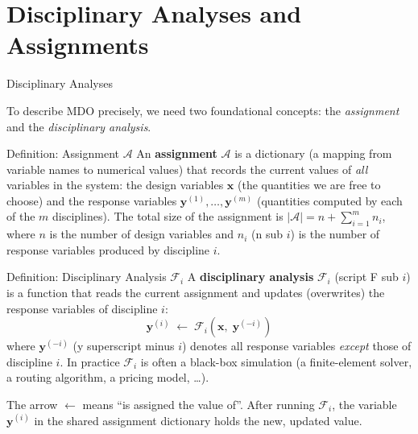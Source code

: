 \documentclass[aspectratio=169,10pt]{beamer}
\begin{document}
\section{Disciplinary Analyses and Assignments}

\begin{frame}[allowframebreaks]{Disciplinary Analyses}

  To describe MDO precisely, we need two foundational concepts: the
  \emph{assignment} and the \emph{disciplinary analysis}.

  \begin{block}{Definition: Assignment $\mathcal{A}$}
    An \textbf{assignment} $\mathcal{A}$ is a dictionary (a mapping from
    variable names to numerical values) that records the current values of
    \emph{all} variables in the system: the design variables $\mathbf{x}$
    (the quantities we are free to choose) and the response variables
    $\mathbf{y}^{(1)}, \ldots, \mathbf{y}^{(m)}$ (quantities computed by
    each of the $m$ disciplines).  The total size of the assignment is
    $|\mathcal{A}| = n + \sum_{i=1}^{m} n_i$, where $n$ is the number of
    design variables and $n_i$ (n sub $i$) is the number of response
    variables produced by discipline $i$.
  \end{block}

  \begin{block}{Definition: Disciplinary Analysis $\mathcal{F}_i$}
    A \textbf{disciplinary analysis} $\mathcal{F}_i$ (script F sub $i$) is
    a function that reads the current assignment and updates (overwrites)
    the response variables of discipline $i$:
    \[
      \mathbf{y}^{(i)} \;\leftarrow\; \mathcal{F}_i\!\left(\mathbf{x},\;
      \mathbf{y}^{(-i)}\right)
    \]
    where $\mathbf{y}^{(-i)}$ (y superscript minus $i$) denotes all
    response variables \emph{except} those of discipline $i$.  In practice
    $\mathcal{F}_i$ is often a black-box simulation (a finite-element solver,
    a routing algorithm, a pricing model, \ldots).
  \end{block}

  \medskip
  The arrow $\leftarrow$ means ``is assigned the value of''.  After running
  $\mathcal{F}_i$, the variable $\mathbf{y}^{(i)}$ in the shared assignment
  dictionary holds the new, updated value.

  \framebreak


\end{frame}
\end{document}
